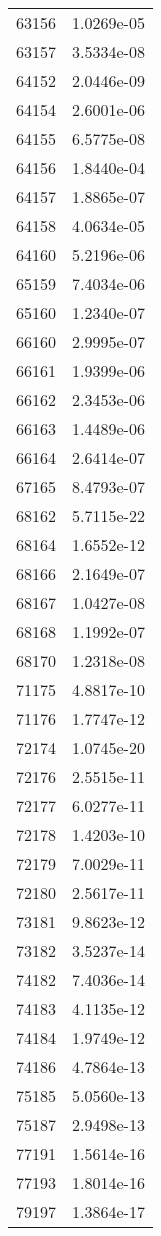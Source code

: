 \begin{table}[h!]
\begin{tabular}{|| c || c |}
63156 & 1.0269e-05 \\
63157 & 3.5334e-08 \\
64152 & 2.0446e-09 \\
64154 & 2.6001e-06 \\
64155 & 6.5775e-08 \\
64156 & 1.8440e-04 \\
64157 & 1.8865e-07 \\
64158 & 4.0634e-05 \\
64160 & 5.2196e-06 \\
65159 & 7.4034e-06 \\
65160 & 1.2340e-07 \\
66160 & 2.9995e-07 \\
66161 & 1.9399e-06 \\
66162 & 2.3453e-06 \\
66163 & 1.4489e-06 \\
66164 & 2.6414e-07 \\
67165 & 8.4793e-07 \\
68162 & 5.7115e-22 \\
68164 & 1.6552e-12 \\
68166 & 2.1649e-07 \\
68167 & 1.0427e-08 \\
68168 & 1.1992e-07 \\
68170 & 1.2318e-08 \\
71175 & 4.8817e-10 \\
71176 & 1.7747e-12 \\
72174 & 1.0745e-20 \\
72176 & 2.5515e-11 \\
72177 & 6.0277e-11 \\
72178 & 1.4203e-10 \\
72179 & 7.0029e-11 \\
72180 & 2.5617e-11 \\
73181 & 9.8623e-12 \\
73182 & 3.5237e-14 \\
74182 & 7.4036e-14 \\
74183 & 4.1135e-12 \\
74184 & 1.9749e-12 \\
74186 & 4.7864e-13 \\
75185 & 5.0560e-13 \\
75187 & 2.9498e-13 \\
77191 & 1.5614e-16 \\
77193 & 1.8014e-16 \\
79197 & 1.3864e-17 \\

\end{tabular}
\end{table}
